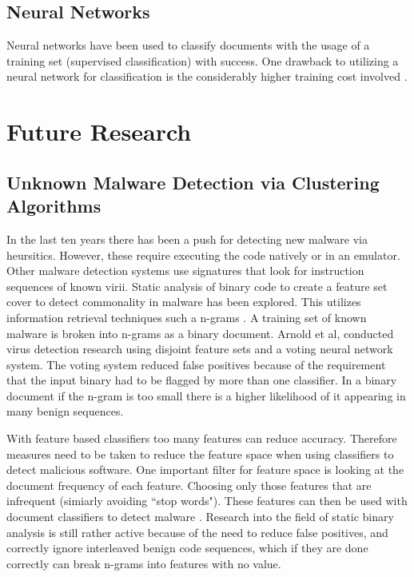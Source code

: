 \documentclass[11pt,twocolumn]{article}
\begin{document}
\subsection{Neural Networks}
Neural networks have been used to classify documents with the usage of a training set (supervised classification) with success.  One drawback to utilizing a neural network for classification is the considerably higher training cost involved \cite{Yang1999}.

\section{Future Research}
\subsection{Unknown Malware Detection via Clustering Algorithms}
In the last ten years there has been a push for detecting new malware via heursitics.  However, these require executing the code natively or in an emulator.  Other malware detection systems use signatures that look for instruction sequences of known virii.  Static analysis of binary code to create a feature set cover to detect commonality in malware has been explored.  This utilizes information retrieval techniques such a n-grams \cite{Arno2000}.  A training set of known malware is broken into n-grams as a binary document.  Arnold et al, conducted virus detection research using disjoint feature sets and a voting neural network system.  The voting system reduced false positives because of the requirement that the input binary had to be flagged by more than one classifier.  In a binary document if the n-gram is too small there is a higher likelihood of it appearing in many benign sequences.

With feature based classifiers too many features can reduce accuracy.  Therefore measures need to be taken to reduce the feature space when using classifiers to detect malicious software.  One important filter for feature space is looking at the document frequency of each feature.  Choosing only those features that are infrequent (simiarly avoiding ``stop words").  These features can then be used with document classifiers to detect malware \cite{Mosk2008}.  Research into the field of static binary analysis is still rather active because of the need to reduce false positives, and correctly ignore interleaved benign code sequences, which if they are done correctly can break n-grams into features with no value.
\end{document}
